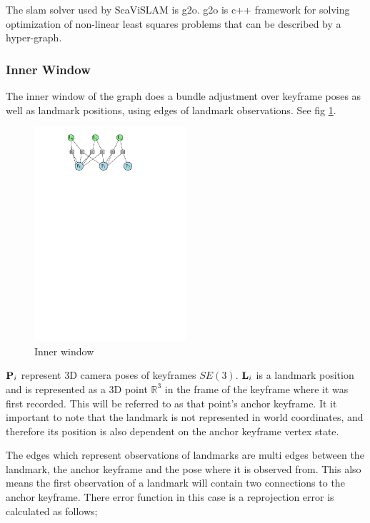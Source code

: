 The slam solver used by ScaViSLAM is g2o.  g2o is c++ framework for solving optimization of non-linear least squares problems that can be described by a hyper-graph.

\subsubsection{Inner Window}

The inner window of the graph does a bundle adjustment over keyframe poses as well as landmark positions, using edges of landmark observations.  See fig \ref{fig:inner_window}.

\begin{figure}[h!]
  \centering
    \includegraphics[width=0.5\textwidth]{chapters/images/inner_window}
  \caption{Inner window}
  \label{fig:inner_window}
\end{figure}

$\mathbf P_i$ represent 3D camera poses of keyframes $SE(3)$.  $\mathbf L_i$ is a landmark position and is represented as a 3D point $\mathbb{R}^3$ in the frame of the keyframe where it was first recorded.  This will be referred to as that point's anchor keyframe.  It it important to note that the landmark is not represented in world coordinates, and therefore its position is also dependent on the anchor keyframe vertex state.

The edges which represent observations of landmarks are multi edges between the landmark, the anchor keyframe and the pose where it is observed from.  This also means the first observation of a landmark will contain two connections to the anchor keyframe. There error function in this case is a reprojection error is calculated as follows;

